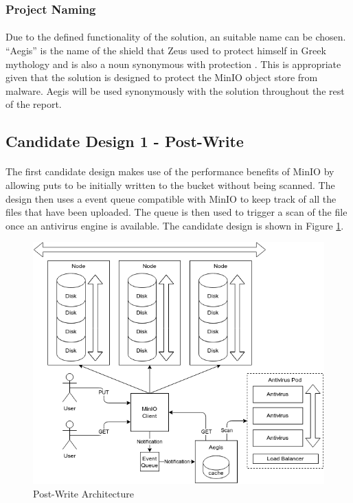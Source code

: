 \documentclass[12pt, conference, final, a4paper, onecolumn, compsoc]{IEEEtran}
\begin{document}
\subsubsection*{Project Naming}
\paragraph{}
Due to the defined functionality of the solution, an suitable name can be
chosen. ``Aegis'' is the name of the shield that Zeus used to protect himself in
Greek mythology and is also a noun synonymous with protection \citep{aegis}. This is
appropriate given that the solution is designed to protect the MinIO object
store from malware. Aegis will be used synonymously with the solution throughout
the rest of the report.

\subsection{Candidate Design 1 - Post-Write}
\paragraph{}

The first candidate design makes use of the performance benefits of MinIO by
allowing puts to be initially written to the bucket without being scanned. The
design then uses a event queue compatible with MinIO to keep track of all the
files that have been uploaded. The queue is then used to trigger a scan of the
file once an antivirus engine is available. The candidate design is shown in Figure
\ref{fig:postWriteArch}.

\begin{figure}
  \includegraphics[scale=.4]{diagrams/post-write.png}
  \caption{Post-Write Architecture}
  \label{fig:postWriteArch}
\end{figure}
\end{document}
